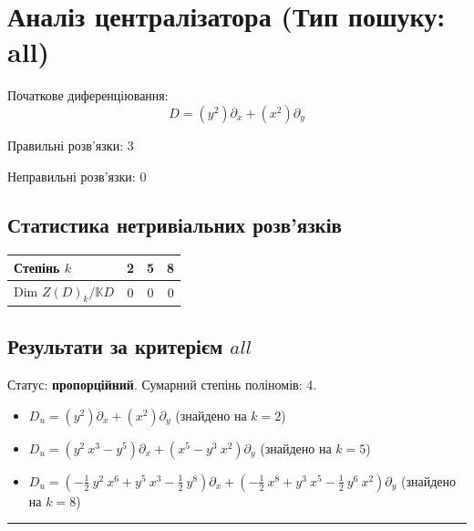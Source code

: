 
\section*{Аналіз централізатора (Тип пошуку: all)}
Початкове диференціювання:
\begin{equation*}
  D = \left( y^{2} \right) \partial_x + \left( x^{2} \right) \partial_y
\end{equation*}

Правильні розв'язки: 3

Неправильні розв'язки: 0
\subsection*{Статистика нетривіальних розв'язків}
\begin{table}[h!]
\centering
\begin{tabular}{|l|c|c|c|}
\hline
Степінь $ k $ & 2 & 5 & 8 \\ \hline
Dim $ Z(D)_k / \mathbb{K}D $ & 0 & 0 & 0 \\ \hline
\end{tabular}
\end{table}
\subsection*{Результати за критерієм $ all $}
Статус: \textbf{пропорційний}. Сумарний степінь поліномів: 4.\\
\begin{itemize}
  \item $ D_u = (y^{2})\partial_x + (x^{2})\partial_y $ (знайдено на $ k = 2 $)
  \item $ D_u = (y^{2} ~ x^{3} - y^{5})\partial_x + (x^{5} - y^{3} ~ x^{2})\partial_y $ (знайдено на $ k = 5 $)
  \item $ D_u = ( - \frac{1}{2} ~ y^{2} ~ x^{6} + y^{5} ~ x^{3} - \frac{1}{2} ~ y^{8})\partial_x + ( - \frac{1}{2} ~ x^{8} + y^{3} ~ x^{5} - \frac{1}{2} ~ y^{6} ~ x^{2})\partial_y $ (знайдено на $ k = 8 $)
\end{itemize}
\hrule
